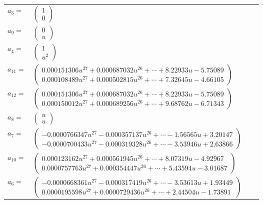 \documentclass[1p]{elsarticle_modified}
\theoremstyle{definition}
\begin{document}
\begin{tabular}{m{7pt} m{180pt} m{7pt} m{180pt} }
\flushright $a_{3}=$&$\begin{pmatrix}1\\0\end{pmatrix}$ \\
\flushright $a_{9}=$&$\begin{pmatrix}0\\u\end{pmatrix}$ \\
\flushright $a_{4}=$&$\begin{pmatrix}1\\u^2\end{pmatrix}$ \\
\flushright $a_{11}=$&$\begin{pmatrix}0.000151306 u^{27}+0.000687032 u^{26}+\cdots+8.22933 u-5.75089\\0.000108489 u^{27}+0.000502815 u^{26}+\cdots+7.32645 u-4.66105\end{pmatrix}$ \\
\flushright $a_{12}=$&$\begin{pmatrix}0.000151306 u^{27}+0.000687032 u^{26}+\cdots+8.22933 u-5.75089\\0.000150012 u^{27}+0.000689256 u^{26}+\cdots+9.68762 u-6.71343\end{pmatrix}$ \\
\flushright $a_{8}=$&$\begin{pmatrix}u\\u\end{pmatrix}$ \\
\flushright $a_{7}=$&$\begin{pmatrix}-0.0000766347 u^{27}-0.000357137 u^{26}+\cdots-1.56565 u+3.20147\\-0.0000700433 u^{27}-0.000319328 u^{26}+\cdots-3.53946 u+2.63866\end{pmatrix}$ \\
\flushright $a_{10}=$&$\begin{pmatrix}0.000123162 u^{27}+0.000561945 u^{26}+\cdots+8.07319 u-4.92967\\0.0000757763 u^{27}+0.000354447 u^{26}+\cdots+5.43594 u-3.01687\end{pmatrix}$ \\
\flushright $a_{6}=$&$\begin{pmatrix}-0.0000668361 u^{27}-0.000317419 u^{26}+\cdots-3.53613 u+1.93449\\0.0000195598 u^{27}+0.0000729436 u^{26}+\cdots+2.44504 u-1.73891\end{pmatrix}$ \\

\end{tabular}
\end{document}
